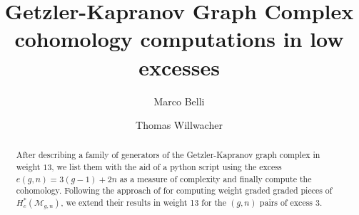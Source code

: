 \documentclass[12pt]{amsart}
\author{Marco Belli}
\author{Thomas Willwacher}
\title{Getzler-Kapranov Graph Complex cohomology computations in low excesses}
\theoremstyle{definition}
\numberwithin{equation}{section}
\newcommand{\M}{\mathcal{M}}
\theoremstyle{definition} %
\theoremstyle{remark}
\begin{document}
\begin{abstract}
    After describing a family of generators of the Getzler-Kapranov graph complex in weight $13$, we list them with the aid of a python script using the excess $e(g,n)=3(g-1)+2n$ as a measure of complexity and finally compute the cohomology. Following the approach of \cite{CLPW2} for computing weight graded graded pieces of $H^*_c(\M_{g,n})$, we extend their results in weight 13 for the $(g,n)$ pairs of excess $3$.
\end{abstract}

\maketitle











%






\end{document}
